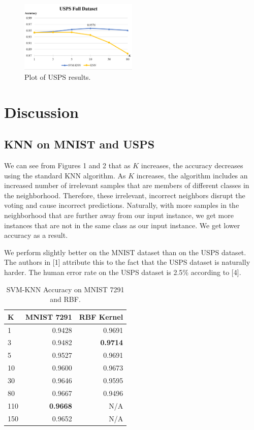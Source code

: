 \documentclass[11pt,letterpaper]{article}
\begin{document}
\begin{figure}[t!]
  \centering
  \includegraphics[keepaspectratio, width=0.5\textwidth]{usps_full.png}
  \caption{Plot of USPS results.}
\end{figure}

\section{Discussion}

\subsection{KNN on MNIST and USPS}

We can see from Figures 1 and 2 that as $K$ increases, the accuracy decreases using the standard KNN algorithm. As $K$ increases, the algorithm includes an increased number of irrelevant samples that are members of different classes in the neighborhood. Therefore, these irrelevant, incorrect neighbors disrupt the voting and cause incorrect predictions. Naturally, with more samples in the neighborhood that are further away from our input instance, we get more instances that are not in the same class as our input instance. We get lower accuracy as a result.

We perform slightly better on the MNIST dataset than on the USPS dataset. The authors in [1] attribute this to the fact that the USPS dataset is naturally harder. The human error rate on the USPS dataset is 2.5$\%$ according to [4]. 

\begin{table}
\begin{center}
\begin{tabular}{|l|r|r|}
\hline \bf K & \bf MNIST 7291 & \bf RBF Kernel \\ \hline
1 & 0.9428 & 0.9691 \\
3 & 0.9482 & \textbf{0.9714} \\
5 & 0.9527 & 0.9691\\
10 & 0.9600 & 0.9673\\
30 & 0.9646 & 0.9595\\
80 & 0.9667  & 0.9496\\
110 & \textbf{0.9668} & N/A\\
150 & 0.9652 & N/A\\
\hline
\end{tabular}
\end{center}
\caption{\label{knn-mnist} SVM-KNN Accuracy on MNIST 7291 and RBF.}
\end{table}
\end{document}
